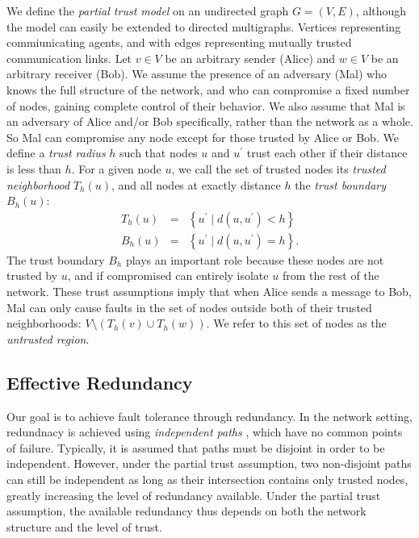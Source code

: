 \documentclass[twocolumn]{article}
\newcommand{\beq}{\begin{eqnarray}}
\newcommand{\eeq}{\end{eqnarray}}
\begin{document}
We define the {\em partial trust model} on
an undirected graph $G = (V,E)$,
although the model can easily be extended to directed multigraphs.
Vertices representing commiunicating agents,
and with edges representing mutually trusted communication links.
Let $v \in V$ be an arbitrary sender (Alice)
and $w \in V$ be an arbitrary receiver (Bob).
We assume the presence of an adversary (Mal) who knows the
full structure of the network,
and who can compromise a fixed number of nodes,
gaining complete control of their behavior.
We also assume that Mal is an adversary of Alice and/or Bob specifically,
rather than the network as a whole.
So Mal can compromise any node except for those trusted by Alice or Bob.
We define a {\em trust radius} $h$ such that nodes $u$ and
$u^\prime$ trust each other if their distance is less than $h$.
For a given node $u$,
we call the set of trusted nodes its
{\em trusted neighborhood} $T_h(u)$,
and all nodes at exactly distance $h$ the
{\em trust boundary} $B_h(u)$:
\beq
T_h(u) &=& \left\{ u^\prime \mid d(u,u^\prime) < h \right\} \\
B_h(u) &=& \left\{ u^\prime \mid d(u,u^\prime) = h \right\}.
\eeq
The trust boundary $B_h$ plays an important role because these nodes are not
trusted by $u$,
and if compromised can entirely isolate $u$ from the rest of the network.
These trust assumptions imply that when Alice sends a message to Bob,
Mal can only cause faults in the set of nodes outside both of their trusted
neighborhoods: $V \setminus \left(T_h(v) \cup T_h(w)\right)$.
We refer to this set of nodes as the {\em untrusted region}.

\subsection{Effective Redundancy}

Our goal is to achieve fault tolerance through redundancy.
In the network setting, redundnacy is achieved using
{\em independent paths} \cite{reiter_resilient_1998},
which have no common points of failure.
Typically, it is assumed that paths must be disjoint in order to be
independent.
However, under the partial trust assumption, two non-disjoint paths
can still be independent as long as their intersection contains only trusted
nodes,
greatly increasing the level of redundancy available.
Under the partial trust assumption, the available redundancy thus depends on
both the network structure and the level of trust.
\end{document}
